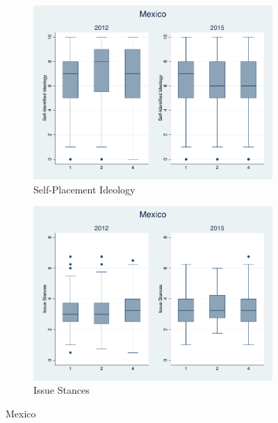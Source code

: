 \documentclass[12pt, titlepage]{article}
\begin{document}
\begin{figure}[H]
	\centering
	\begin{subfigure}[b]{0.475\textwidth}   
		\centering 
		\includegraphics[width=\textwidth]{IdeoBP/Mexico}
		\caption{Self-Placement Ideology}
	\end{subfigure}
	\hfill
	\begin{subfigure}[b]{0.475\textwidth}
		\centering 
		\includegraphics[width=\textwidth]{BoxLib/Mexico}
		\caption{Issue Stances}
	\end{subfigure}
	\caption{Mexico}
	\label{Mexico}
\end{figure}
\end{document}
